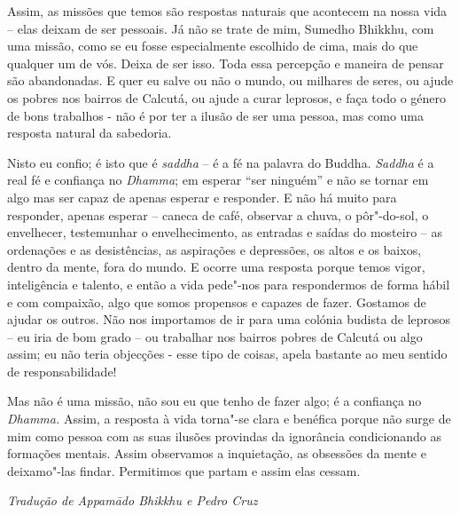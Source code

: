 Assim, as missões que temos são respostas naturais que acontecem na
nossa vida -- elas deixam de ser pessoais. Já não se trate de mim,
Sumedho Bhikkhu, com uma missão, como se eu fosse especialmente
escolhido de cima, mais do que qualquer um de vós. Deixa de ser isso.
Toda essa percepção e maneira de pensar são abandonadas. E quer eu salve
ou não o mundo, ou milhares de seres, ou ajude os pobres nos bairros de
Calcutá, ou ajude a curar leprosos, e faça todo o género de bons
trabalhos - não é por ter a ilusão de ser uma pessoa, mas como uma
resposta natural da sabedoria.

Nisto eu confio; é isto que é \emph{saddha} -- é a fé na palavra do
Buddha. \emph{Saddha} é a real fé e confiança no \emph{Dhamma}; em
esperar ``ser ninguém'' e não se tornar em algo mas ser capaz de apenas
esperar e responder. E não há muito para responder, apenas esperar --
caneca de café, observar a chuva, o pôr"-do-sol, o envelhecer,
testemunhar o envelhecimento, as entradas e saídas do mosteiro -- as
ordenações e as desistências, as aspirações e depressões, os altos e os
baixos, dentro da mente, fora do mundo. E ocorre uma resposta porque
temos vigor, inteligência e talento, e então a vida pede"-nos para
respondermos de forma hábil e com compaixão, algo que somos propensos e
capazes de fazer. Gostamos de ajudar os outros. Não nos importamos de ir
para uma colónia budista de leprosos -- eu iria de bom grado -- ou
trabalhar nos bairros pobres de Calcutá ou algo assim; eu não teria
objecções - esse tipo de coisas, apela bastante ao meu sentido de
responsabilidade!

Mas não é uma missão, não sou eu que tenho de fazer algo; é a confiança
no \emph{Dhamma.} Assim, a resposta à vida torna"-se clara e benéfica
porque não surge de mim como pessoa com as suas ilusões provindas da
ignorância condicionando as formações mentais. Assim observamos a
inquietação, as obsessões da mente e deixamo"-las findar. Permitimos que
partam e assim elas cessam.

\bigskip

{\raggedleft\itshape
  Tradução de Appamādo Bhikkhu e Pedro Cruz
\par}
